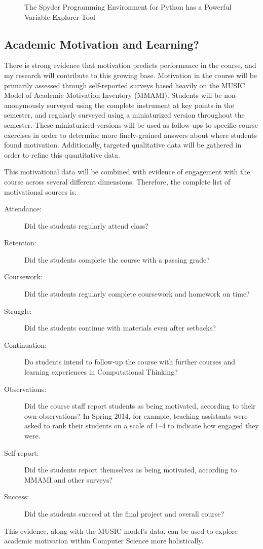 \begin{figure}[!ht]
\label{fig-spyder-explorer}
\caption{The Spyder Programming Environment for Python has a Powerful Variable Explorer Tool}
\end{figure}

\subsection{Academic Motivation and Learning?}
There is strong evidence that motivation predicts performance in the course, and my research will contribute to this growing base.
Motivation in the course will be primarily assessed through self-reported surveys based heavily on the MUSIC Model of Academic Motivation Inventory (MMAMI).
Students will be non-anonymously surveyed using the complete instrument at key points in the semester, and regularly surveyed using a miniaturized version throughout the semester.
These miniaturized versions will be used as follow-ups to specific course exercises in order to determine more finely-grained answers about where students found motivation.
Additionally, targeted qualitative data will be gathered in order to refine this quantitative data.

This motivational data will be combined with evidence of engagement with the course across several different dimensions. Therefore, the complete list of motivational sources is:
\begin{description}
	\item[Attendance:] Did the students regularly attend class?
	\item[Retention:] Did the students complete the course with a passing grade?
	\item[Coursework:] Did the students regularly complete coursework and homework on time?
	\item[Struggle:] Did the students continue with materials even after setbacks?
	\item[Continuation:] Do students intend to follow-up the course with further courses and learning experiences in Computational Thinking?
	\item[Observations:] Did the course staff report students as being motivated, according to their own observations? In Spring 2014, for example, teaching assistants were asked to rank their students on a scale of 1--4 to indicate how engaged they were.
	\item[Self-report:] Did the students report themselves as being motivated, according to MMAMI and other surveys?
	\item[Success:] Did the students succeed at the final project and overall course?
\end{description}
This evidence, along with the MUSIC model's data, can be used to explore academic motivation within Computer Science more holistically.

